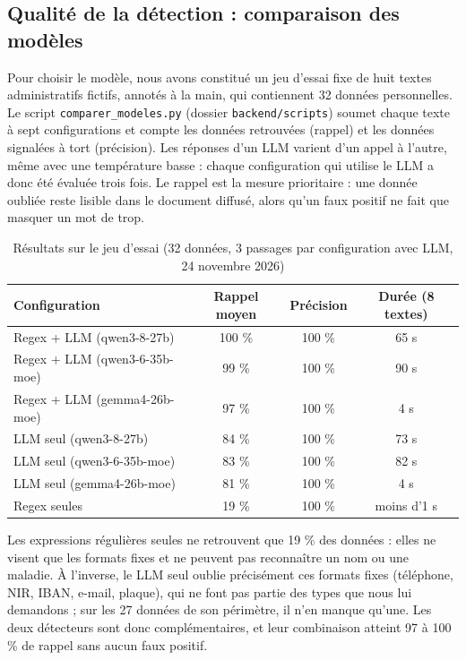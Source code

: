 \documentclass[12pt,a4paper]{article}
\begin{document}
\subsection{Qualité de la détection : comparaison des modèles}
\label{sec:comparaison}

Pour choisir le modèle, nous avons constitué un jeu d'essai fixe de huit textes administratifs fictifs, annotés à la main, qui contiennent 32 données personnelles. Le script \texttt{comparer\_modeles.py} (dossier \texttt{backend/scripts}) soumet chaque texte à sept configurations et compte les données retrouvées (rappel) et les données signalées à tort (précision). Les réponses d'un LLM varient d'un appel à l'autre, même avec une température basse : chaque configuration qui utilise le LLM a donc été évaluée trois fois. Le rappel est la mesure prioritaire : une donnée oubliée reste lisible dans le document diffusé, alors qu'un faux positif ne fait que masquer un mot de trop.

\begin{table}[htbp]
    \centering
    \small
    \begin{tabular}{lccc}
        \toprule
        \textbf{Configuration} & \textbf{Rappel moyen} & \textbf{Précision} & \textbf{Durée (8 textes)} \\
        \midrule
        Regex + LLM (qwen3-8-27b) & 100 \% & 100 \% & 65 s \\
        Regex + LLM (qwen3-6-35b-moe) & 99 \% & 100 \% & 90 s \\
        Regex + LLM (gemma4-26b-moe) & 97 \% & 100 \% & 4 s \\
        LLM seul (qwen3-8-27b) & 84 \% & 100 \% & 73 s \\
        LLM seul (qwen3-6-35b-moe) & 83 \% & 100 \% & 82 s \\
        LLM seul (gemma4-26b-moe) & 81 \% & 100 \% & 4 s \\
        Regex seules & 19 \% & 100 \% & moins d'1 s \\
        \bottomrule
    \end{tabular}
    \caption{Résultats sur le jeu d'essai (32 données, 3 passages par configuration avec LLM, 24 novembre 2026)}
    \label{tab:comparaison}
\end{table}

Les expressions régulières seules ne retrouvent que 19 \% des données : elles ne visent que les formats fixes et ne peuvent pas reconnaître un nom ou une maladie. À l'inverse, le LLM seul oublie précisément ces formats fixes (téléphone, NIR, IBAN, e-mail, plaque), qui ne font pas partie des types que nous lui demandons ; sur les 27 données de son périmètre, il n'en manque qu'une. Les deux détecteurs sont donc complémentaires, et leur combinaison atteint 97 à 100 \% de rappel sans aucun faux positif.
\end{document}
